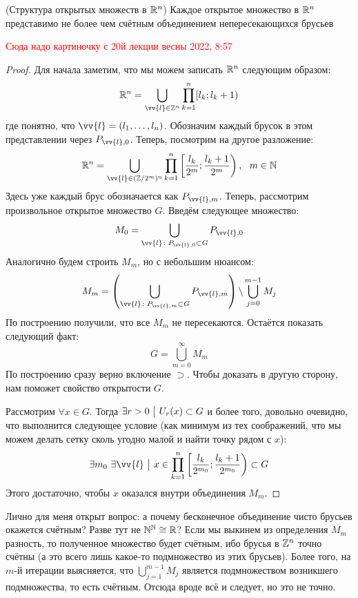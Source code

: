 \begin{theorem} (Структура открытых множеств в $\mathbb{R}^n$)
	Каждое открытое множество в $\mathbb{R}^n$ представимо не более чем счётным объединением непересекающихся брусьев
\end{theorem}

\textcolor{red}{Сюда надо картиночку с 20й лекции весны 2022, 8:57}

\begin{proof}
	Для начала заметим, что мы можем записать $\mathbb{R}^n$ следующим образом:
	\[
		\R^n = \bigcup_{\vv{l} \in \Z^n} \prod_{k = 1}^n [l_k; l_k + 1)
	\]
	где понятно, что $\vv{l} = (l_1, \ldots, l_n)$. Обозначим каждый брусок в этом представлении через $P_{\vv{l}, 0}$. Теперь, посмотрим на другое разложение:
	\[
		\R^n = \bigcup_{\vv{l} \in (\Z / 2^m)^n} \prod_{k = 1}^n \left[\frac{l_k}{2^m}; \frac{l_k + 1}{2^m}\right),\ \ m \in \N
	\]
	Здесь уже каждый брус обозначается как $P_{\vv{l}, m}$. Теперь, рассмотрим произвольное открытое множество $G$. Введём следующее множество:
	\[
		M_0 = \bigcup_{\vv{l} \colon P_{\vv{l}, 0} \subset G} P_{\vv{l}, 0}
	\]
	Аналогично будем строить $M_m$, но с небольшим нюансом:
	\[
		M_m = \left(\bigcup_{\vv{l} \colon P_{\vv{l}, m} \subset G} P_{\vv{l}, m}\right) \bs \bigcup_{j = 0}^{m - 1} M_j
	\]
	По построению получили, что все $M_m$ не пересекаются. Остаётся показать следующий факт:
	\[
		G = \bigcup_{m = 0}^\infty M_m
	\]
	По построению сразу верно включение $\supset$. Чтобы доказать в другую сторону, нам поможет свойство открытости $G$. 
	
	Рассмотрим $\forall x \in G$. Тогда \(\exists r > 0 \ \big|\  U_r(x) \subset G\) и более того, довольно очевидно, что выполнится следующее условие (как минимум из тех соображений, что мы можем делать сетку сколь угодно малой и найти точку рядом с $x$):
	\[
		\exists m_0\ \exists \vv{l} \such x \in \prod_{k = 1}^n \left[\frac{l_k}{2^{m_0}}; \frac{l_k + 1}{2^{m_0}}\right) \subset G
	\]
	Этого достаточно, чтобы $x$ оказался внутри объединения $M_m$.
\end{proof}

\begin{anote}
	Лично для меня открыт вопрос: а почему бесконечное объединение чисто брусьев окажется счётным? Разве тут не $\mathbb{N}^{\mathbb{N}} \cong \mathbb{R}$? Если мы выкинем из определения $M_m$ разность, то полученное множество будет счётным, ибо брусья в $\mathbb{Z}^n$ точно счётны (а это всего лишь какое-то подмножество из этих брусьев). Более того, на $m$-й итерации выясняется, что $\bigcup_{j = 1}^{m - 1} M_j$ является подмножеством возникшего подмножества, то есть счётным. Отсюда вроде всё и следует, но это не точно.
\end{anote}

